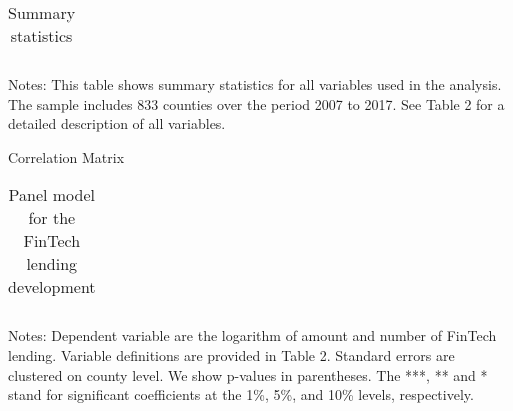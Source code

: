 \documentclass[11pt, a4paper, leqno]{article}
\begin{document}
\begin{center}
\begin{table}[!h!] \caption{Summary statistics \label{sumstat}}
\begin{threeparttable}
\begin{tabularx}{\linewidth}{X*{6}{l c c c c c}}



\end{tabularx}
  \begin{tablenotes}
      \scriptsize
      \item Notes: This table shows summary statistics for all variables used in the analysis. The sample includes 833 counties over the period 2007 to 2017. See Table 2 for a detailed description of all variables.
      \end{tablenotes}
\end{threeparttable}
\end{table}
\end{center}



\begin{landscape}
\begin{table}[!h!] \caption{Correlation Matrix \label{table:corr}}



\end{table}
\end{landscape}



\begin{center}
\begin{table}[!h!] \caption{Panel model for the FinTech lending development \label{table:baseline}}
\begin{threeparttable}
\begin{footnotesize}
\begin{tabularx}{\textwidth}{Xrrrr}



\end{tabularx}
\end{footnotesize}
  \begin{tablenotes}
      \scriptsize
      \item Notes: Dependent variable are the logarithm of amount and number of FinTech lending. Variable definitions are provided in Table 2. Standard errors are clustered on county level. We show p-values in parentheses. The ***, ** and  * stand for significant coefficients at the 1\%, 5\%, and  10\% levels, respectively.
      \end{tablenotes}
\end{threeparttable}
\end{table}
\end{center}
\end{document}
